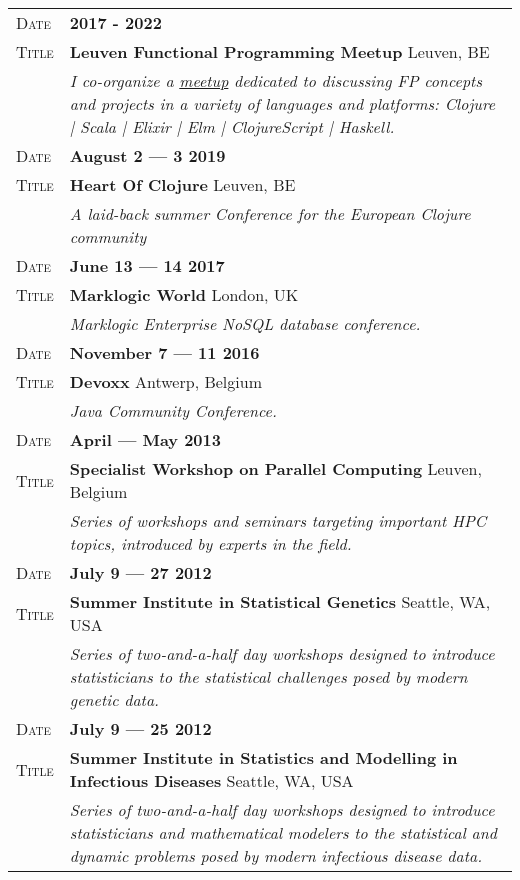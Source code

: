\documentclass[a4paper, oneside, final]{scrartcl}
\newcommand{\gray}{\rowcolor[gray]{.90}}
\begin{document}
\begin{center}
\begin{tabularx}{0.97\linewidth}{>{\raggedleft\scshape}p{2cm}X}
      \gray Date & \textbf{2017 - 2022}\\
      \gray Title  & \textbf{Leuven Functional Programming Meetup} \hfill Leuven, BE\\
      & \emph{I co-organize a \href{https://www.meetup.com/Leuven-Functional-Programming-Meetup/}{meetup} dedicated to discussing FP concepts and projects in a variety of languages and platforms: Clojure | Scala | Elixir | Elm | ClojureScript | Haskell. }
      \\

      \gray Date & \textbf{August 2 --- 3 2019}\\
      \gray Title  & \textbf{Heart Of Clojure} \hfill Leuven, BE\\
      & \emph{ A laid-back summer Conference for the European Clojure community }
      \\

             \gray Date & \textbf{June 13 --- 14 2017}\\
    \gray Title  & \textbf{Marklogic World} \hfill London, UK\\
           & \emph{Marklogic Enterprise NoSQL database conference.}
   \\

             \gray Date & \textbf{November 7 --- 11 2016}\\
    \gray Title  & \textbf{Devoxx} \hfill Antwerp, Belgium\\
           & \emph{Java Community Conference.}
   \\

             \gray Date & \textbf{April --- May 2013}\\
    \gray Title  & \textbf{Specialist Workshop on Parallel Computing} \hfill Leuven, Belgium\\
           & \emph{Series of workshops and seminars targeting important HPC topics, introduced by experts in the field.}
   \\

         \gray Date & \textbf{July 9 --- 27 2012}\\
    \gray Title  & \textbf{Summer Institute in Statistical Genetics} \hfill Seattle, WA, USA\\
           & \emph{Series of two-and-a-half day workshops designed to introduce statisticians to the statistical challenges posed by modern genetic data.}
   \\

        \gray Date & \textbf{July 9 --- 25 2012}\\
    \gray Title  & \textbf{Summer Institute in Statistics and Modelling in Infectious Diseases} \hfill Seattle, WA, USA\\
           & \emph{Series of two-and-a-half day workshops designed to introduce statisticians and mathematical modelers to the statistical and dynamic problems posed by modern infectious disease data.}
   \\


\end{tabularx}
\end{center}
\end{document}
